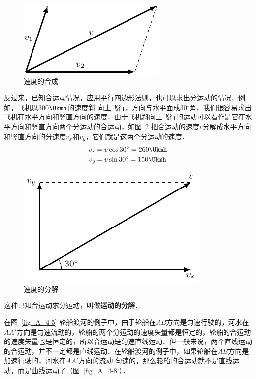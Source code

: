 \begin{figure}[htbp]
    \centering
    \includegraphics{fig/A/4-6.pdf}
    \caption{速度的合成}\label{fig_A_4-6}
\end{figure}

反过来，已知合运动情况，应用平行四边形法则，也可以求出分运动的情况．例如，飞机以300$\Ukmh$的速度斜
向上飞行，方向与水平面成30$^\circ$角，我们很容易求出飞机在水平方向和竖直方向的速度．由于飞机斜向上飞行的运动可以看作是它在水平方向和竖直方向两个分运动的合运动，如图~\ref{fig_A_4-7} 把合运动的速度$v$分解成水平方向和竖直方向的分速度$v_x$和$v_y$，它们就是这两个分运动的速度．
\[\begin{split}
v_x&=v\cos30^{\circ}=260\Ukmh\\
v_y&=v\sin 30^{\circ}=150\Ukmh\\
\end{split} \]

\begin{figure}[htbp]
    \centering
    \includegraphics{fig/A/4-7.pdf}
    \caption{速度的分解}\label{fig_A_4-7}
\end{figure}

这种已知合运动求分运动，叫做\textbf{运动的分解}．

在图~\ref{fig_A_4-5} 轮船渡河的例子中，由于轮船在$AB$方向是匀速行驶的，河水在$AA'$方向是匀速流动的，轮船的两个分运动的速度矢量都是恒定的，轮船的合运动的速度矢量也是恒定的，所以合运动是匀速直线运动．但一般来说，两个直线运动的合运动，并不一定都是直线运动．在轮船渡河的例子中，如果轮船在$AB$方向是加速行驶的，河水在$AA'$方向的流动
匀速的，那么轮船的合运动就不是直线运动，而是曲线运动了（图~\ref{fig_A_4-8}）．

